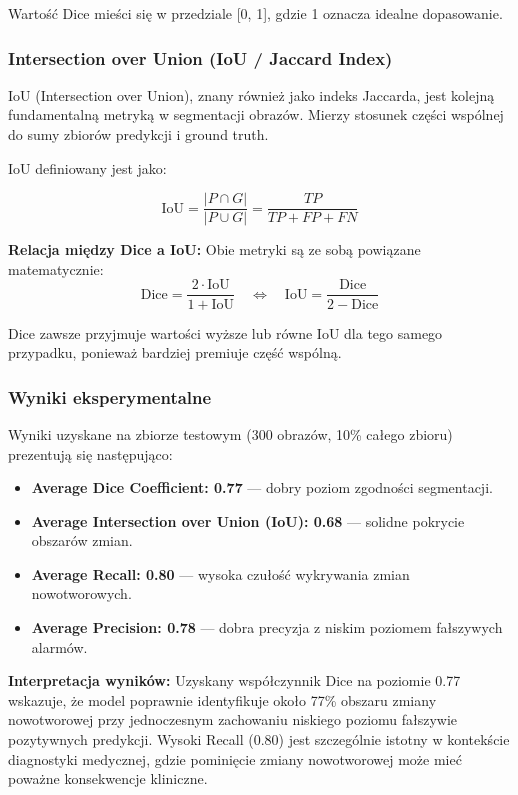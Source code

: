 \documentclass[12pt,a4paper]{article}
\begin{document}
Wartość Dice mieści się w przedziale [0, 1], gdzie 1 oznacza idealne dopasowanie.

\subsubsection{Intersection over Union (IoU / Jaccard Index)}
IoU (Intersection over Union), znany również jako indeks Jaccarda, jest kolejną fundamentalną metryką w segmentacji obrazów. Mierzy stosunek części wspólnej do sumy zbiorów predykcji i ground truth.

IoU definiowany jest jako:

\begin{equation}
\text{IoU} = \frac{|P \cap G|}{|P \cup G|} = \frac{TP}{TP + FP + FN}
\end{equation}

\textbf{Relacja między Dice a IoU:}
Obie metryki są ze sobą powiązane matematycznie:
\begin{equation}
\text{Dice} = \frac{2 \cdot \text{IoU}}{1 + \text{IoU}} \quad \Leftrightarrow \quad \text{IoU} = \frac{\text{Dice}}{2 - \text{Dice}}
\end{equation}

Dice zawsze przyjmuje wartości wyższe lub równe IoU dla tego samego przypadku, ponieważ bardziej premiuje część wspólną.

\subsubsection{Wyniki eksperymentalne}
Wyniki uzyskane na zbiorze testowym (300 obrazów, 10\% całego zbioru) prezentują się następująco:
\begin{itemize}
    \item \textbf{Average Dice Coefficient: 0.77} — dobry poziom zgodności segmentacji.
    \item \textbf{Average Intersection over Union (IoU): 0.68} — solidne pokrycie obszarów zmian.
    \item \textbf{Average Recall: 0.80} — wysoka czułość wykrywania zmian nowotworowych.
    \item \textbf{Average Precision: 0.78} — dobra precyzja z niskim poziomem fałszywych alarmów.
\end{itemize}

\textbf{Interpretacja wyników:}
Uzyskany współczynnik Dice na poziomie 0.77 wskazuje, że model poprawnie identyfikuje około 77\% obszaru zmiany nowotworowej przy jednoczesnym zachowaniu niskiego poziomu fałszywie pozytywnych predykcji. Wysoki Recall (0.80) jest szczególnie istotny w kontekście diagnostyki medycznej, gdzie pominięcie zmiany nowotworowej może mieć poważne konsekwencje kliniczne.
\end{document}
